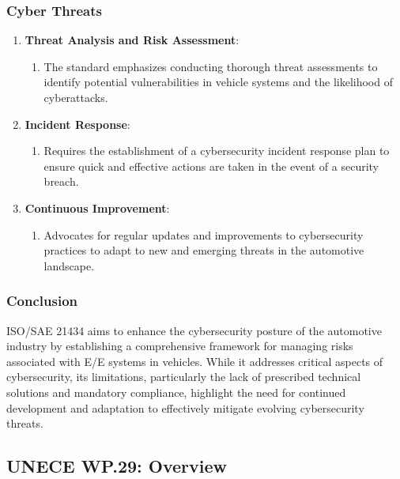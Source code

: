 \subsubsection{Cyber Threats}\label{subsubsec:cyber-threats}

\begin{enumerate}
    \item \textbf{Threat Analysis and Risk Assessment}:
    \begin{enumerate}
        \item The standard emphasizes conducting thorough threat assessments to identify potential vulnerabilities in vehicle systems and the likelihood of cyberattacks.
    \end{enumerate}

    \item \textbf{Incident Response}:
    \begin{enumerate}
        \item Requires the establishment of a cybersecurity incident response plan to ensure quick and effective actions are taken in the event of a security breach.
    \end{enumerate}

    \item \textbf{Continuous Improvement}:
    \begin{enumerate}
        \item Advocates for regular updates and improvements to cybersecurity practices to adapt to new and emerging threats in the automotive landscape.
    \end{enumerate}
\end{enumerate}

\subsubsection{Conclusion}\label{subsubsec:conclusion}

ISO/SAE 21434 aims to enhance the cybersecurity posture of the automotive industry by establishing a comprehensive framework for managing risks associated with E/E systems in vehicles.
While it addresses critical aspects of cybersecurity, its limitations, particularly the lack of prescribed technical solutions and mandatory compliance, highlight the need for continued development and adaptation to effectively mitigate evolving cybersecurity threats.

\subsection{UNECE WP.29: Overview}\label{subsec:unece-wp-29}


